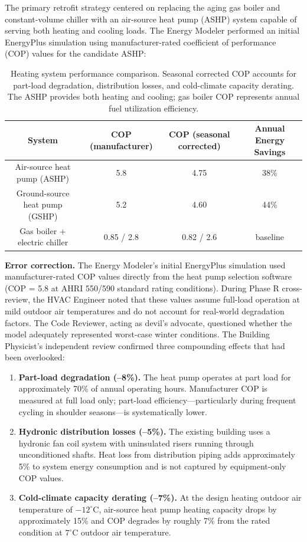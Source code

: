 \documentclass[11pt,a4paper]{article}
\begin{document}
The primary retrofit strategy centered on replacing the aging gas boiler and constant-volume chiller with an air-source heat pump (ASHP) system capable of serving both heating and cooling loads. The Energy Modeler performed an initial EnergyPlus simulation using manufacturer-rated coefficient of performance (COP) values for the candidate ASHP:

\begin{table}[htbp]
\centering
\begin{tabular}{c|c|c|c}
\toprule
\textbf{System} & \textbf{COP (manufacturer)} & \textbf{COP (seasonal corrected)} & \textbf{Annual Energy Savings} \\
\midrule
Air-source heat pump (ASHP)    & 5.8 & 4.75 & 38\% \\
Ground-source heat pump (GSHP) & 5.2 & 4.60 & 44\% \\
Gas boiler + electric chiller  & 0.85 / 2.8 & 0.82 / 2.6 & baseline \\
\bottomrule
\end{tabular}
\caption{Heating system performance comparison. Seasonal corrected COP accounts for part-load degradation, distribution losses, and cold-climate capacity derating. The ASHP provides both heating and cooling; gas boiler COP represents annual fuel utilization efficiency.}
\label{tab:hvac}
\end{table}

\textbf{Error correction.} The Energy Modeler's initial EnergyPlus simulation used manufacturer-rated COP values directly from the heat pump selection software (COP = 5.8 at AHRI 550/590 standard rating conditions). During Phase R cross-review, the HVAC Engineer noted that these values assume full-load operation at mild outdoor air temperatures and do not account for real-world degradation factors. The Code Reviewer, acting as devil's advocate, questioned whether the model adequately represented worst-case winter conditions. The Building Physicist's independent review confirmed three compounding effects that had been overlooked:

\begin{enumerate}
    \item \textbf{Part-load degradation (--8\%).} The heat pump operates at part load for approximately 70\% of annual operating hours. Manufacturer COP is measured at full load only; part-load efficiency---particularly during frequent cycling in shoulder seasons---is systematically lower.
    \item \textbf{Hydronic distribution losses (--5\%).} The existing building uses a hydronic fan coil system with uninsulated risers running through unconditioned shafts. Heat loss from distribution piping adds approximately 5\% to system energy consumption and is not captured by equipment-only COP values.
    \item \textbf{Cold-climate capacity derating (--7\%).} At the design heating outdoor air temperature of $-12^\circ$C, air-source heat pump heating capacity drops by approximately 15\% and COP degrades by roughly 7\% from the rated condition at $7^\circ$C outdoor air temperature.
\end{enumerate}
\end{document}
